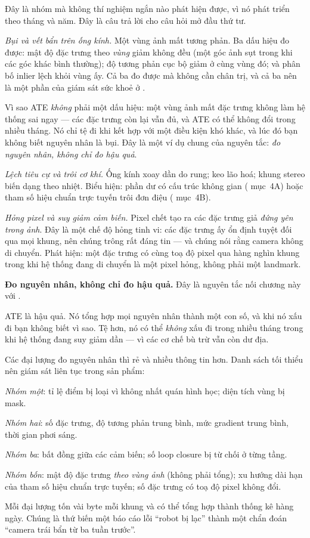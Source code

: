 \documentclass[../../vslam.tex]{subfiles}
\begin{document}
Đây là nhóm mà không thí nghiệm ngắn nào phát hiện được, vì nó phát triển theo tháng và năm. Đây là câu trả lời cho câu hỏi mở đầu thứ tư.

\emph{Bụi và vết bẩn trên ống kính.} Một vùng ảnh mất tương phản. Ba dấu hiệu đo được: mật độ đặc trưng theo \emph{vùng} giảm không đều (một góc ảnh sụt trong khi các góc khác bình thường); độ tương phản cục bộ giảm ở cùng vùng đó; và phân bố inlier lệch khỏi vùng ấy. Cả ba đo được mà không cần chân trị, và cả ba nên là một phần của giám sát sức khoẻ ở .

Vì sao ATE \emph{không} phải một dấu hiệu: một vùng ảnh mất đặc trưng không làm hệ thống sai ngay --- các đặc trưng còn lại vẫn đủ, và ATE có thể không đổi trong nhiều tháng. Nó chỉ tệ đi khi kết hợp với một điều kiện khó khác, và lúc đó bạn không biết nguyên nhân là bụi. Đây là một ví dụ chung của nguyên tắc: \emph{đo nguyên nhân, không chỉ đo hậu quả}.

\emph{Lệch tiêu cự và trôi cơ khí.} Ống kính xoay dần do rung; keo lão hoá; khung stereo biến dạng theo nhiệt. Biểu hiện: phần dư có cấu trúc không gian ( mục~4A) hoặc tham số hiệu chuẩn trực tuyến trôi đơn điệu ( mục~4B).

\emph{Hỏng pixel và suy giảm cảm biến.} Pixel chết tạo ra các đặc trưng giả \emph{đứng yên trong ảnh}. Đây là một chế độ hỏng tinh vi: các đặc trưng ấy ổn định tuyệt đối qua mọi khung, nên chúng trông rất đáng tin --- và chúng nói rằng camera không di chuyển. Phát hiện: một đặc trưng có cùng toạ độ pixel qua hàng nghìn khung trong khi hệ thống đang di chuyển là một pixel hỏng, không phải một landmark.

\begin{cannho}
\textbf{Đo nguyên nhân, không chỉ đo hậu quả.} Đây là nguyên tắc nối chương này với .

ATE là hậu quả. Nó tổng hợp mọi nguyên nhân thành một con số, và khi nó xấu đi bạn không biết vì sao. Tệ hơn, nó có thể \emph{không} xấu đi trong nhiều tháng trong khi hệ thống đang suy giảm dần --- vì các cơ chế bù trừ vẫn còn dư địa.

Các đại lượng đo nguyên nhân thì rẻ và nhiều thông tin hơn. Danh sách tối thiểu nên giám sát liên tục trong sản phẩm:

\emph{Nhóm một}: tỉ lệ điểm bị loại vì không nhất quán hình học; diện tích vùng bị mask.

\emph{Nhóm hai}: số đặc trưng, độ tương phản trung bình, mức gradient trung bình, thời gian phơi sáng.

\emph{Nhóm ba}: bất đồng giữa các cảm biến; số loop closure bị từ chối ở từng tầng.

\emph{Nhóm bốn}: mật độ đặc trưng \emph{theo vùng ảnh} (không phải tổng); xu hướng dài hạn của tham số hiệu chuẩn trực tuyến; số đặc trưng có toạ độ pixel không đổi.

Mỗi đại lượng tốn vài byte mỗi khung và có thể tổng hợp thành thống kê hàng ngày. Chúng là thứ biến một báo cáo lỗi ``robot bị lạc'' thành một chẩn đoán ``camera trái bẩn từ ba tuần trước''.
\end{cannho}
\end{document}
